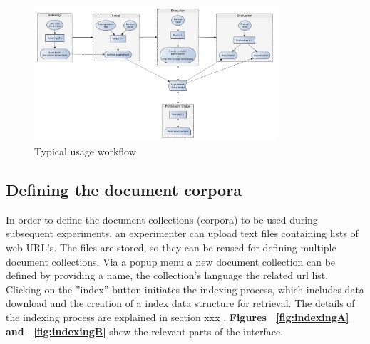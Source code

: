 \documentclass[]{usiinfbachelorproject}
\begin{document}
\vspace{1cm}

\begin{figure} [h]
\centering
\includegraphics[width=0.8\textwidth]{img/yed/usage}
\caption{Typical usage workflow}
\label{fig:usage}
\end{figure}


\newpage

\subsection{Defining the document corpora}

In order to define the document collections (corpora) to be used during subsequent experiments, 
an experimenter can upload text files containing lists of web URL's. The files are  stored, so they can be reused 
for defining multiple document collections. Via a popup menu a new  document collection can be defined by providing a name, 
the collection's language the related url list.
Clicking on the ''index'' button initiates the indexing process, which includes data download and the creation of a index
data structure for retrieval. The details of the indexing process are explained in section xxx .
\textbf{Figures ~\ref{fig:indexingA} and ~\ref{fig:indexingB}} show the relevant parts of the interface.
\end{document}
